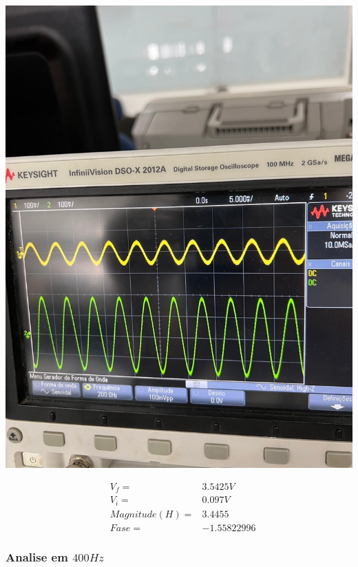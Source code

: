 \documentclass[12pt,twoside, a4paper, twocolumn]{article}
\begin{document}
\begin{adjustbox}{scale=0.18}
    \includegraphics{freq200.jpeg}
\end{adjustbox}

\begin{equation*}
    \begin{aligned}
         & V_f =          & 3.5425V     \\
         & V_i =          & 0.097V      \\
         & Magnitude(H) = & 3.4455      \\
         & Fase =         & -1.55822996
    \end{aligned}
\end{equation*}

\subsubsection{Analise em $400Hz$}
\subparagraph*{}
\end{document}
